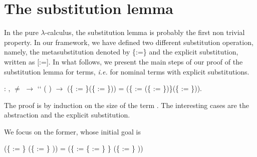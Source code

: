 \section{The substitution lemma}



 In the pure $\lambda$-calculus, the substitution lemma is probably the first non trivial property. In our framework, we have defined two different substitution operation, namely, the metasubstitution denoted by \{:=\} and the explicit substitution, written as [:=]. In what follows, we present the main steps of our proof of the substitution lemma for  terms, {\it i.e.} for nominal terms with explicit substitutions. 
\begin{coqdoccode}
\coqdocemptyline
\coqdocnoindent
{} : \coqdockw{\ensuremath{\forall}}     ,  \ensuremath{\not=}  \ensuremath{\rightarrow}  `` ( ) \ensuremath{\rightarrow}\coqdoceol
\coqdocindent{10.50em}
(\{ := \}(\{ := \})) = (\{ := (\{ := \})\}(\{ := \})).\coqdoceol
\end{coqdoccode}
 The proof is by induction on the size of the term . The interesting cases are the abstraction and the explicit substitution.
\begin{coqdoccode}
\end{coqdoccode}
We focus on the former, whose initial goal is


(\{ := \} (\{ := \}   )) = (\{ := \{ := \} \} (\{ := \}   ))


